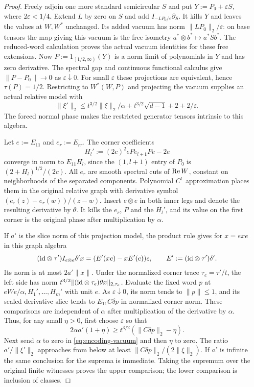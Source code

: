 \begin{proof}
Freely adjoin one more standard semicircular $S$ and put $Y:=P_0+\varepsilon S$, where $2\varepsilon<1/4$.
Extend $L$ by zero on $S$ and add $I_{-LP_0/\varepsilon}\partial_S$.
It kills $Y$ and leaves the values at $W,W^*$ unchanged.
Its added vacuum has norm $\|LP_0\|_2/\varepsilon$: on base tensors the map giving this vacuum is the free isometry $a^*\otimes b^*\mapsto a^*Sb^*$.
The reduced-word calculation proves the actual vacuum identities for these free extensions.
Now $P:=1_{(1/2,\infty)}(Y)$ is a norm limit of polynomials in $Y$ and has zero derivative.
The spectral gap and continuous functional calculus give $\|P-P_0\|\to0$ as $\varepsilon\downarrow0$.
For small $\varepsilon$ these projections are equivalent, hence $\tau(P)=1/2$.
Restricting to $W^*(W,P)$ and projecting the vacuum supplies an actual relative model with
\begin{equation}\label{eq:encoding-vacuum}
 \|\xi'\|_2\le t^{3/2}\|\xi\|_2/\alpha+t^{3/2}\sqrt{d-1}+2+2/\varepsilon.
\end{equation}
The forced normal phase makes the restricted generator tensors intrinsic to this algebra.

Let $e:=E_{11}$ and $e_r:=E_{rr}$.
The corner coefficients
\[
 H_l':=(2c)^2ePe_{l+1}Pe-2e
\]
converge in norm to $E_{11}H_l$, since the $(1,l+1)$ entry of $P_0$ is $(2+H_l)^{1/2}/(2c)$.
All $e_r$ are smooth spectral cuts of $\operatorname{Re} W$, constant on neighborhoods of the separated components.
Polynomial $C^1$ approximation places them in the original relative graph with derivative symbol $(e_r(z)-e_r(w))/(z-w)$.
Insert $e\otimes e$ in both inner legs and denote the resulting derivative by $\theta$.
It kills the $e_r$, $P$ and the $H_l'$, and its value on the first corner is the original phase after multiplication by $\alpha$.

If $a'$ is the slice norm of this projection model, the product rule gives for $x=exe$ in this graph algebra
\[
 (\mathrm{id}\otimes\tau')I_{e\otimes e}\delta' x
 =(E'(xe)-xE'(e))e,\qquad E':=(\mathrm{id}\otimes\tau')\delta'.
\]
Its norm is at most $2a'\|x\|$.
Under the normalized corner trace $\tau_e=\tau'/t$, the left side has norm $t^{3/2}\|(\mathrm{id}\otimes\tau_e)\theta x\|_{2,\tau_e}$.
Evaluate the fixed word $p$ at $eWe/\alpha,H_1',\ldots,H_m'$ with unit $e$.
As $\varepsilon\downarrow0$, its norm tends to $\|p\|\le1$, and its scaled derivative slice tends to $E_{11}C\delta p$ in normalized corner norm.
These comparisons are independent of $\alpha$ after multiplication of the derivative by $\alpha$.
Thus, for any small $\eta>0$, first choose $\varepsilon$ so that
\[
 2\alpha a'(1+\eta)\ge t^{3/2}(\|C\delta p\|_2-\eta).
\]
Next send $\alpha$ to zero in \eqref{eq:encoding-vacuum} and then $\eta$ to zero.
The ratio $a'/\|\xi'\|_2$ approaches from below at least $\|C\delta p\|_2/(2\|\xi\|_2)$.
If $a'$ is infinite the same conclusion for the suprema is immediate.
Taking the supremum over the original finite witnesses proves the upper comparison; the lower comparison is inclusion of classes.
\end{proof}
